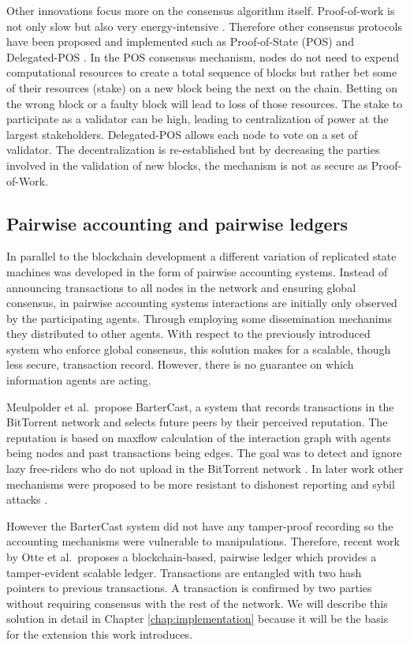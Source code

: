 Other innovations focus more on the consensus algorithm itself. Proof-of-work is not only slow but
also very energy-intensive \cite{bitcoin_energy}. Therefore other consensus protocols have been 
proposed and implemented such as Proof-of-State (POS) and Delegated-POS \cite{bentov2016cryptocurrencies, kiayias2017ouroboros}.
In the POS consensus mechanism, nodes do not need to expend computational resources to create a 
total sequence of blocks but rather bet some of their resources (stake) on a new block being the
next on the chain. Betting on the wrong block or a faulty block will lead to loss of those resources.
The stake to participate as a validator can be high, leading to centralization of power at the largest
stakeholders. Delegated-POS allows each node to vote on a set of validator. The decentralization is
re-established but by decreasing the parties involved in the validation of new blocks, the mechanism
is not as secure as Proof-of-Work.

\subsection{Pairwise accounting and pairwise ledgers}
In parallel to the blockchain development a different variation of replicated state machines was 
developed in the form of pairwise accounting systems. Instead of announcing transactions to all 
nodes in the network and ensuring global consensus, in pairwise accounting systems interactions are
initially only observed by the participating agents. Through employing some dissemination mechanims they 
distributed to other agents. With respect to the previously introduced system who enforce global 
consensus, this solution makes for a scalable, though less secure, transaction record. However, there is no 
guarantee on which information agents are acting.

Meulpolder et al.\ propose BarterCast, a system that records transactions in the BitTorrent network
and selects future peers by their perceived reputation. The reputation is based on maxflow 
calculation of the interaction graph with agents being nodes and past transactions being edges. The
goal was to detect and ignore lazy free-riders who do not upload in the BitTorrent network \cite{meulpolder2009bartercast}.
In later work other mechanisms were proposed to be more resistant to dishonest reporting and sybil
attacks \cite{seuken2010accounting, seuken2014sybil}.

However the BarterCast system did not have any tamper-proof recording so the accounting mechanisms were
vulnerable to manipulations. Therefore, recent work by Otte et al.\ proposes a blockchain-based, pairwise
ledger which provides a tamper-evident scalable ledger. Transactions are 
entangled with two hash pointers to previous transactions. A transaction is confirmed by two parties
without requiring consensus with the rest of the network. We will describe this solution in detail 
in Chapter \ref{chap:implementation} because it will be the basis for the extension this work
introduces. 

